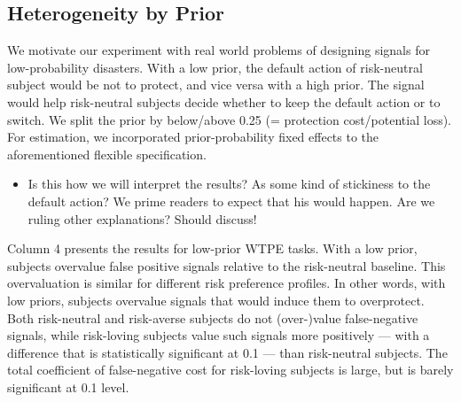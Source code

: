 \documentclass[12pt,a4paper]{article}
\newcommand{\agt}[1]{{\color{OliveGreen}#1}}
\begin{document}

\subsection{Heterogeneity by Prior}

We motivate our experiment with real world problems of designing signals for low-probability disasters. With a low prior, the default action of risk-neutral subject would be not to protect, and vice versa with a high prior. The signal would help risk-neutral subjects decide whether to keep the default action or to switch. We split the prior by below/above 0.25 (= protection cost/potential loss).  For estimation, we incorporated prior-probability fixed effects to the aforementioned flexible specification. 

\begin{itemize}
	\item\agt{Is this how we will interpret the results? As some kind of stickiness to the default action? We prime readers to expect that his would happen. Are we ruling other explanations? Should discuss! }
\end{itemize}

Column 4 presents the results for low-prior WTPE tasks. With a low prior, subjects overvalue false positive signals relative to the risk-neutral baseline. This overvaluation is similar for different risk preference profiles. In other words, with low priors, subjects overvalue signals that would induce them to overprotect. Both risk-neutral and risk-averse subjects do not (over-)value false-negative signals, while risk-loving subjects value such signals more positively --- with a difference that is statistically significant at 0.1 --- than risk-neutral subjects. The total coefficient of false-negative cost for risk-loving subjects is large, but is barely significant at 0.1 level. 
\end{document}
